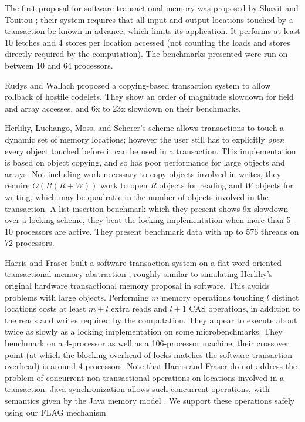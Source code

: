 \documentclass[12pt]{article}
\begin{document}
The first proposal for software transactional memory was proposed by
Shavit and Touitou \cite{ShavitTo95}; their system requires that all
input and output locations touched by a transaction be known in
advance, which limits its application.  It performs at least 10
fetches and 4 stores per location accessed (not counting the loads and
stores directly required by the computation).  The benchmarks
presented were run on between 10 and 64 processors.

Rudys and Wallach \cite{RudysWa02} proposed a copying-based
transaction system to allow rollback of hostile codelets.
They show an order of magnitude slowdown for field and array
accesses, and 6x to 23x slowdown on their benchmarks.

Herlihy, Luchango, Moss, and Scherer's scheme \cite{HerlihyLuMoSc03}
allows transactions to touch a dynamic set of memory locations;
however the user still has to explicitly \emph{open} every object touched
before it can be used in a transaction.  This implementation is based
on object copying, and so has poor performance for large objects and
arrays.  Not including work necessary to copy objects involved in
writes, they require $O(R(R+W))$ work to open $R$ objects for reading
and $W$ objects for writing, which may be quadratic in the number of objects
involved in the transaction.   A list insertion benchmark which they
present shows 9x slowdown over a locking scheme, they beat the locking
implementation when more than 5-10 processors are active.  They
present benchmark data with up to 576 threads on 72 processors.

Harris and Fraser built a software transaction system on a flat
word-oriented transactional memory abstraction \cite{HarrisFr03},
roughly similar to simulating Herlihy's original hardware
transactional memory proposal in software.  This avoids problems with
large objects.  Performing $m$ memory operations touching $l$ distinct
locations costs at least $m+l$ extra reads and $l+1$ CAS operations, in
addition to the reads and writes required by the computation.
They appear to execute about twice as slowly as a locking
implementation on some microbenchmarks.  They benchmark on a
4-processor as well as a 106-processor machine; their crossover point
(at which the blocking overhead of locks matches the software
transaction overhead) is around 4 processors.
Note that Harris and Fraser do not address the problem of
concurrent non-transactional operations on locations involved in a
transaction.  Java synchronization allows such concurrent operations,
with semantics given by the Java memory model \cite{MansonPu02}.
We support these operations safely using our FLAG mechanism.
\end{document}
